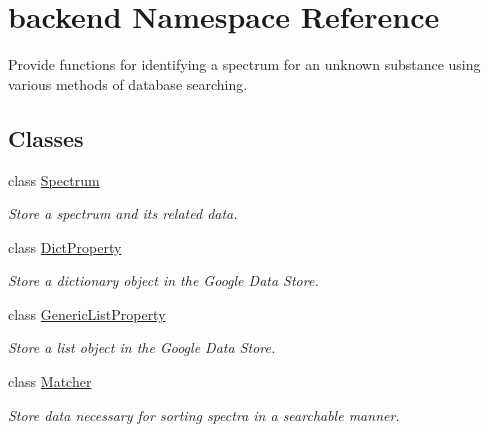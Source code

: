 \hypertarget{namespacebackend}{
\section{backend Namespace Reference}
\label{namespacebackend}
}


Provide functions for identifying a spectrum for an unknown substance using various methods of database searching.  


\subsection*{Classes}
\begin{DoxyCompactItemize}
\item 
class \hyperlink{classbackend_1_1_spectrum}{Spectrum}
\begin{DoxyCompactList}\small\item\em Store a spectrum and its related data. \item\end{DoxyCompactList}\item 
class \hyperlink{classbackend_1_1_dict_property}{DictProperty}
\begin{DoxyCompactList}\small\item\em Store a dictionary object in the Google Data Store. \item\end{DoxyCompactList}\item 
class \hyperlink{classbackend_1_1_generic_list_property}{GenericListProperty}
\begin{DoxyCompactList}\small\item\em Store a list object in the Google Data Store. \item\end{DoxyCompactList}\item 
class \hyperlink{classbackend_1_1_matcher}{Matcher}
\begin{DoxyCompactList}\small\item\em Store data necessary for sorting spectra in a searchable manner. \item\end{DoxyCompactList}\end{DoxyCompactItemize}
